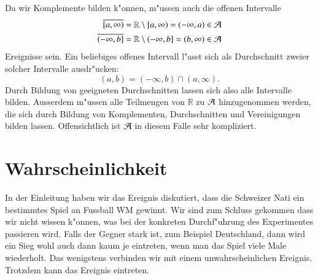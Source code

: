 Da wir Komplemente bilden k"onnen, m"ussen auch die offenen Intervalle
\begin{align*}
\overline{[a,\infty)}&=\mathbb R\setminus [a,\infty)=(-\infty,a)\in\cal A\\
\overline{(-\infty,b]}&=\mathbb R\setminus (-\infty,b]= (b,\infty)\in\cal A
\end{align*}
Ereignisse sein.
Ein beliebiges offenes Intervall l"asst sich
als Durchschnitt zweier solcher Intervalle ausdr"ucken:
\[
(a,b)=(-\infty, b)\cap(a,\infty).
\]
Durch Bildung von geeigneten Durchschnitten lassen sich also alle
Intervalle bilden.
Ausserdem m"ussen alle Teilmengen von $\mathbb R$
zu $\cal A$ hinzugenommen werden, die sich durch Bildung von Komplementen,
Durchschnitten und Vereinigungen bilden lassen.
Offensichtlich ist $\cal A$
in diesem Falle sehr kompliziert.

\section{Wahrscheinlichkeit} \label{section-wahrscheinlichkeit}
In der Einleitung haben wir das Ereignis diskutiert, dass die Schweizer
Nati ein bestimmtes Spiel an Fussball WM gewinnt.
Wir sind zum Schluss
gekommen dass wir nicht wissen k"onnen, was bei der konkreten
Durchf"uhrung des Experimentes passieren wird.
Falls der Gegner
stark ist, zum Beispiel Deutschland, dann wird ein Sieg wohl auch
dann kaum je eintreten, wenn man das Spiel viele Male wiederholt.
Das wenigstens verbinden wir mit einem unwahrscheinlichen Ereignis.
Trotzdem kann das Ereignis eintreten.

